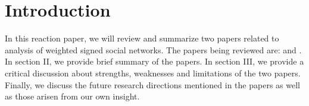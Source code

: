 
\section{Introduction}

In this reaction paper, we will review and summarize two papers related to analysis of weighted signed social networks. The papers being reviewed are: \cite{aw2018analyzing} and \cite{kumar2016edge}. In section II, we provide brief summary of the papers. In section III, we provide a critical discussion about strengths, weaknesses and limitations of the two papers. Finally, we discuss the future research directions mentioned in the papers as well as those arisen from our own insight.





